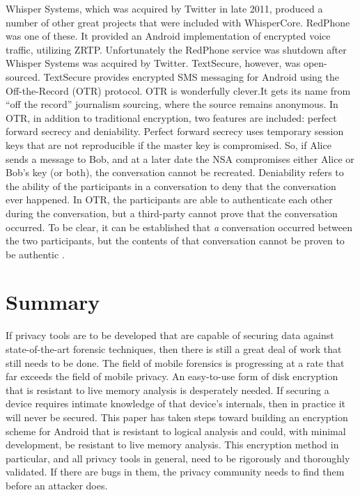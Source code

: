 Whisper Systems, which was acquired by Twitter in late 2011, produced a number of other great projects that were included with
WhisperCore. RedPhone was one of these. It provided an Android implementation of encrypted voice traffic, utilizing ZRTP.
Unfortunately the RedPhone service was shutdown after Whisper Systems was acquired by Twitter. TextSecure, however, was
open-sourced. TextSecure provides encrypted SMS messaging for Android using the Off-the-Record (OTR) protocol. OTR is wonderfully
clever.It gets its name from ``off the record'' journalism sourcing, where the source remains anonymous. In OTR, in addition to
traditional encryption, two features are included: perfect forward secrecy and deniability. Perfect forward secrecy uses
temporary session keys that are not reproducible if the master key is compromised. So, if Alice sends a message to Bob, and at a
later date the NSA compromises either Alice or Bob's key (or both), the conversation cannot be recreated.  Deniability refers to the
ability of the participants in a conversation to deny that the conversation ever happened. In OTR, the participants are able to
authenticate each other during the conversation, but a third-party cannot prove that the conversation occurred. To be clear, it can
be established that \emph{a} conversation occurred between the two participants, but the contents of that conversation cannot be
proven to be authentic \cite{otr}.


\section{Summary}

If privacy tools are to be developed that are capable of securing data against state-of-the-art forensic techniques, then there is
still a great deal of work that still needs to be done. The field of mobile forensics is progressing at a rate that far exceeds the
field of mobile privacy. An easy-to-use form of disk encryption that is resistant to live memory analysis is desperately needed.  If
securing a device requires intimate knowledge of that device's internals, then in practice it will never be secured. This paper has
taken steps toward building an encryption scheme for Android that is resistant to logical analysis and could, with minimal
development, be resistant to live memory analysis. This encryption method in particular, and all privacy tools in general, need to
be rigorously and thoroughly validated. If there are bugs in them, the privacy community needs to find them before an attacker does.
